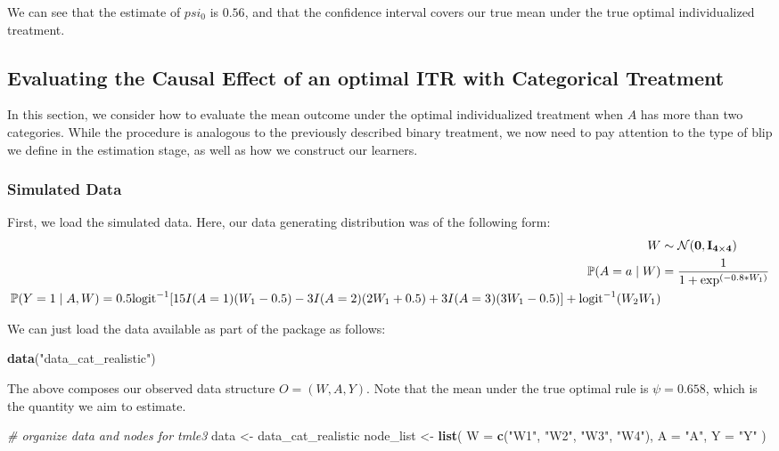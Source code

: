 \documentclass[12pt, krantz2,]{krantz}
\newenvironment{Shaded}{\begin{snugshade}}{\end{snugshade}}
\newcommand{\CommentTok}[1]{\textcolor[rgb]{0.37,0.37,0.37}{\textit{#1}}}
\newcommand{\DataTypeTok}[1]{\textcolor[rgb]{0.27,0.27,0.27}{#1}}
\newcommand{\KeywordTok}[1]{\textcolor[rgb]{0.27,0.27,0.27}{\textbf{#1}}}
\newcommand{\NormalTok}[1]{#1}
\newcommand{\StringTok}[1]{\textcolor[rgb]{0.5,0.5,0.5}{#1}}
\theoremstyle{definition}
\theoremstyle{definition}
\theoremstyle{definition}
\renewcommand{\P}{\mathbb{P}}
\newcommand{\1}{\mathbbm{1}}
\begin{document}
We can see that the estimate of \(psi_0\) is \(0.56\), and that the confidence
interval covers our true mean under the true optimal individualized treatment.

\hypertarget{oit-eval-cat}{%
\subsection{Evaluating the Causal Effect of an optimal ITR with Categorical Treatment}\label{oit-eval-cat}}

In this section, we consider how to evaluate the mean outcome under the optimal
individualized treatment when \(A\) has more than two categories. While the
procedure is analogous to the previously described binary treatment, we now need
to pay attention to the type of blip we define in the estimation stage, as well
as how we construct our learners.

\hypertarget{simulated-data-1}{%
\subsubsection{Simulated Data}\label{simulated-data-1}}

First, we load the simulated data. Here, our data generating distribution was
of the following form:
\begin{align*}
  W &\sim \mathcal{N}(\bf{0},I_{4 \times 4})\\
  \P(A=a \mid W) &= \frac{1}{1+\exp^{(-0.8*W_1)}}\\
  \P(Y=1 \mid A,W) = 0.5\text{logit}^{-1}[15I(A=1)(W_1-0.5) - 3I(A=2)(2W_1+0.5) +
    3I(A=3)(3W_1-0.5)] +\text{logit}^{-1}(W_2W_1)
\end{align*}

We can just load the data available as part of the package as follows:

\begin{Shaded}
\begin{Highlighting}[]
\KeywordTok{data}\NormalTok{(}\StringTok{"data_cat_realistic"}\NormalTok{)}
\end{Highlighting}
\end{Shaded}

The above composes our observed data structure \(O = (W, A, Y)\). Note that the
mean under the true optimal rule is \(\psi=0.658\), which is the quantity we aim
to estimate.

\begin{Shaded}
\begin{Highlighting}[]
\CommentTok{# organize data and nodes for tmle3}
\NormalTok{data <-}\StringTok{ }\NormalTok{data_cat_realistic}
\NormalTok{node_list <-}\StringTok{ }\KeywordTok{list}\NormalTok{(}
  \DataTypeTok{W =} \KeywordTok{c}\NormalTok{(}\StringTok{"W1"}\NormalTok{, }\StringTok{"W2"}\NormalTok{, }\StringTok{"W3"}\NormalTok{, }\StringTok{"W4"}\NormalTok{),}
  \DataTypeTok{A =} \StringTok{"A"}\NormalTok{,}
  \DataTypeTok{Y =} \StringTok{"Y"}
\NormalTok{)}
\end{Highlighting}
\end{Shaded}
\end{document}
